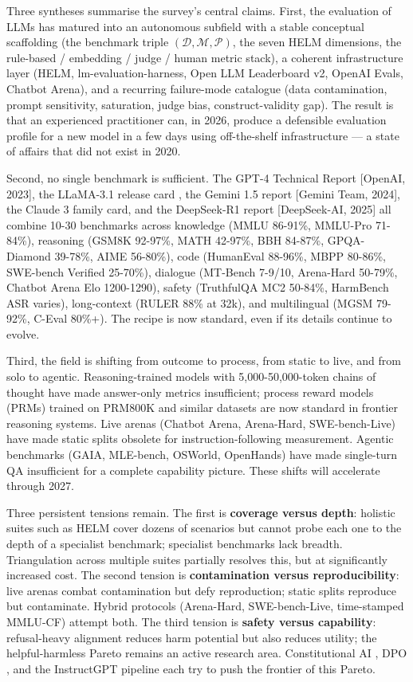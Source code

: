 \documentclass{article}
\begin{document}
Three syntheses summarise the survey's central claims. First, the evaluation of LLMs has matured into an autonomous subfield with a stable conceptual scaffolding (the benchmark triple \((\mathcal{D}, \mathcal{M}, \mathcal{P})\), the seven HELM dimensions, the rule-based / embedding / judge / human metric stack), a coherent infrastructure layer (HELM, lm-evaluation-harness, Open LLM Leaderboard v2, OpenAI Evals, Chatbot Arena), and a recurring failure-mode catalogue (data contamination, prompt sensitivity, saturation, judge bias, construct-validity gap). The result is that an experienced practitioner can, in 2026, produce a defensible evaluation profile for a new model in a few days using off-the-shelf infrastructure --- a state of affairs that did not exist in 2020.

Second, no single benchmark is sufficient. The GPT-4 Technical Report {[}OpenAI, 2023{]}, the LLaMA-3.1 release card \cite{touvron20232023}, the Gemini 1.5 report {[}Gemini Team, 2024{]}, the Claude 3 family card, and the DeepSeek-R1 report {[}DeepSeek-AI, 2025{]} all combine 10-30 benchmarks across knowledge (MMLU 86-91\%, MMLU-Pro 71-84\%), reasoning (GSM8K 92-97\%, MATH 42-97\%, BBH 84-87\%, GPQA-Diamond 39-78\%, AIME 56-80\%), code (HumanEval 88-96\%, MBPP 80-86\%, SWE-bench Verified 25-70\%), dialogue (MT-Bench 7-9/10, Arena-Hard 50-79\%, Chatbot Arena Elo 1200-1290), safety (TruthfulQA MC2 50-84\%, HarmBench ASR varies), long-context (RULER 88\% at 32k), and multilingual (MGSM 79-92\%, C-Eval 80\%+). The recipe is now standard, even if its details continue to evolve.

Third, the field is shifting from outcome to process, from static to live, and from solo to agentic. Reasoning-trained models with 5,000-50,000-token chains of thought have made answer-only metrics insufficient; process reward models (PRMs) trained on PRM800K and similar datasets are now standard in frontier reasoning systems. Live arenas (Chatbot Arena, Arena-Hard, SWE-bench-Live) have made static splits obsolete for instruction-following measurement. Agentic benchmarks (GAIA, MLE-bench, OSWorld, OpenHands) have made single-turn QA insufficient for a complete capability picture. These shifts will accelerate through 2027.

Three persistent tensions remain. The first is \textbf{coverage versus depth}: holistic suites such as HELM cover dozens of scenarios but cannot probe each one to the depth of a specialist benchmark; specialist benchmarks lack breadth. Triangulation across multiple suites partially resolves this, but at significantly increased cost. The second tension is \textbf{contamination versus reproducibility}: live arenas combat contamination but defy reproduction; static splits reproduce but contaminate. Hybrid protocols (Arena-Hard, SWE-bench-Live, time-stamped MMLU-CF) attempt both. The third tension is \textbf{safety versus capability}: refusal-heavy alignment reduces harm potential but also reduces utility; the helpful-harmless Pareto remains an active research area. Constitutional AI \cite{bai20222022}, DPO \cite{rafailov2023directpreferenceop}, and the InstructGPT pipeline \cite{ouyang20222022} each try to push the frontier of this Pareto.
\end{document}
